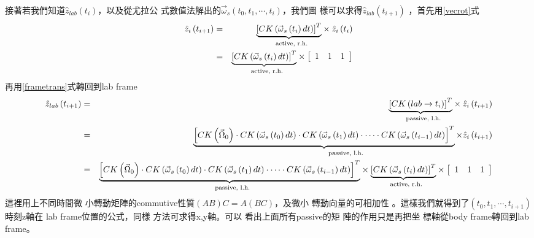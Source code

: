 \documentclass[12pt,a4paper]{article}
\begin{document}
接著若我們知道$\hat{z}_{lab}\left(
t_{i}\right) $，以及從尤拉公%
式數值法解出的$\vec{\omega}%
_{s}\left( t_{0},t_{1},\cdots ,t_{i}\right) $，我們圖%
樣可以求得$\hat{z}_{lab}\left( t_{i+1}\right) $%
，首先用\ref{vecrot}式%
\begin{eqnarray*}
\hat{z}_{i}\left( t_{i+1}\right)  &=&\underset{\text{active, r.h.}}{%
\underbrace{\left[ CK\left( \vec{\omega}_{s}\left( t_{i}\right) dt\right) %
\right] ^{T}}}\times \hat{z}_{i}\left( t_{i}\right)  \\
&=&\underset{\text{active, r.h.}}{\underbrace{\left[ CK\left( \vec{\omega}%
_{s}\left( t_{i}\right) dt\right) \right] ^{T}}}\times \left[ 
\begin{array}{ccc}
1 & 1 & 1%
\end{array}%
\right] 
\end{eqnarray*}%
再用\ref{frametrans}式轉回到lab frame%
\begin{eqnarray*}
\hat{z}_{lab}\left( t_{i+1}\right)  &=&\underset{\text{passive, l.h.}}{%
\underbrace{\left[ CK\left( lab\rightarrow t_{i}\right) \right] ^{T}}}\times 
\hat{z}_{i}\left( t_{i+1}\right)  \\
&=&\underset{\text{passive, l.h.}}{\underbrace{\left[ CK\left( \vec{\Omega}%
_{0}\right) \cdot CK\left( \vec{\omega}_{s}\left( t_{0}\right) dt\right)
\cdot CK\left( \vec{\omega}_{s}\left( t_{1}\right) dt\right) \cdot \cdots
\cdot CK\left( \vec{\omega}_{s}\left( t_{i-1}\right) dt\right) \right] ^{T}}%
\times \hat{z}_{i}\left( t_{i+1}\right) } \\
&=&\underset{\text{passive, l.h.}}{\underbrace{\left[ CK\left( \vec{\Omega}%
_{0}\right) \cdot CK\left( \vec{\omega}_{s}\left( t_{0}\right) dt\right)
\cdot CK\left( \vec{\omega}_{s}\left( t_{1}\right) dt\right) \cdot \cdots
\cdot CK\left( \vec{\omega}_{s}\left( t_{i-1}\right) dt\right) \right] ^{T}}}%
\times \underset{\text{active, r.h.}}{\underbrace{\left[ CK\left( \vec{\omega%
}_{s}\left( t_{i}\right) dt\right) \right] ^{T}}}\times \left[ 
\begin{array}{ccc}
1 & 1 & 1%
\end{array}%
\right] 
\end{eqnarray*}%
這裡用上不同時間微%
小轉動矩陣的commutive性質$%
\left( AB\right) C=A\left( BC\right) $，及微小%
轉動向量的可相加性%
。這樣我們就得到了$%
\left( t_{0},t_{1},\cdots ,t_{i+1}\right) $時刻z軸在%
lab frame位置的公式，同樣%
方法可求得x,y軸。可以%
看出上面所有passive的矩%
陣的作用只是再把坐%
標軸從body frame轉回到lab frame。
\end{document}
